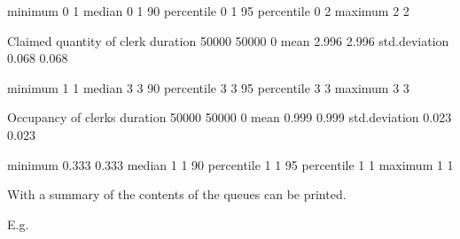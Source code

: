 \documentclass[letterpaper,10pt,english]{sphinxmanual}
\begin{document}
\begin{sphinxVerbatim}[commandchars=\\\{\}]
                                             minimum               0            1
                                             median                0            1
                                             90\PYGZpc{} percentile        0            1
                                             95\PYGZpc{} percentile        0            2
                                             maximum               2            2

Claimed quantity of clerk                    duration          50000        50000            0
                                             mean                  2.996        2.996
                                             std.deviation         0.068        0.068

                                             minimum               1            1
                                             median                3            3
                                             90\PYGZpc{} percentile        3            3
                                             95\PYGZpc{} percentile        3            3
                                             maximum               3            3

Occupancy of clerks                          duration          50000        50000            0
                                             mean                  0.999        0.999
                                             std.deviation         0.023        0.023

                                             minimum               0.333        0.333
                                             median                1            1
                                             90\PYGZpc{} percentile        1            1
                                             95\PYGZpc{} percentile        1            1
                                             maximum               1            1
\end{sphinxVerbatim}

With  a summary of the contents of the queues can be printed.

E.g.

\begin{sphinxVerbatim}[commandchars=\\\{\}]
 
   
            
            
   
            
            
            
\end{sphinxVerbatim}
\end{document}
